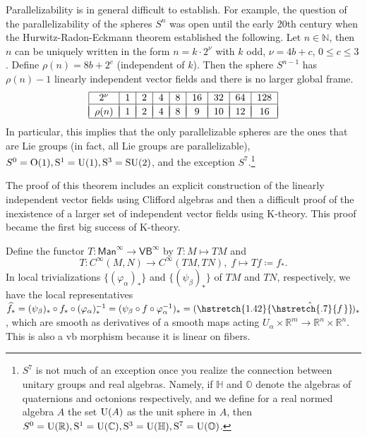 \documentclass[english,letterpaper]{article}%
\numberwithin{equation}{section}
\numberwithin{figure}{section}
\numberwithin{table}{section}
\theoremstyle{definition}
\theoremstyle{definition}
\theoremstyle{definition}
\theoremstyle{plain}
\theoremstyle{plain}
\theoremstyle{plain}
\theoremstyle{plain}
\theoremstyle{remark}
\theoremstyle{remark}
\def\red{\color{red}}
\renewcommand{\leq}{\leqslant}
\newcommand{\PRLsep}{   %
           \noindent\makebox[\linewidth]{
                \resizebox{0.5\linewidth}{1pt}{$\blacklozenge$}}}
\newcommand\wh[1]{\hstretch{1.42}{\hat{\hstretch{.7}{#1\mkern2mu}}}\mkern-2mu} %
\begin{document}
\begin{rem}
Parallelizability is in general difficult to establish. For example, the question of the parallelizability of the spheres $S^n$ was open until the early 20th century when the Hurwitz-Radon-Eckmann theorem established the following. Let $n\in\mathbb{N}$, then $n$ can be uniquely written in the form $n=k\cdot 2^\nu$ with $k$ odd, $\nu=4b+c$, $0\leq c\leq 3$. Define $\rho(n)=8b+2^c$ (independent of $k$). Then the sphere $S^{n-1}$ has $\rho(n)-1$ linearly independent vector fields and there is no larger global frame. 
\[\begin{tabular}{|c|c|c|c|c|c|c|c|c|}
\hline 
$2^\nu$ & 1 & 2 & 4 & 8 & 16 & 32 & 64 & 128\tabularnewline
\hline &&&&&&&&\\[-1em]
$\rho(n)$ &1 & 2 & 4 & 8 & 9 & 10 & 12 & 16\tabularnewline
\hline 
\end{tabular}\]
In particular, this implies that the only parallelizable spheres are the ones that are Lie groups (in fact, all Lie groups are parallelizable), $S^0=\rm{O}(1),S^1=\rm{U}(1),S^3=\rm{SU}(2)$, and the exception $S^7$.\footnote{$S^7$ is not much of an exception once you realize the connection between unitary groups and real algebras. Namely, if $\mathbb{H}$ and $\mathbb{O}$ denote the algebras of quaternions and octonions respectively, and we define for a real normed algebra $A$ the set ${\rm U}(A)$ as the unit sphere in $A$, then $S^0=\rm{U}(\mathbb{R}),S^1=\rm{U}(\mathbb{C}),S^3=\rm{U}(\mathbb{H}),S^7=\rm{U}(\mathbb{O})$.}

The proof of this theorem includes an explicit construction of the linearly independent vector fields using Clifford algebras and then a difficult proof of the inexistence of a larger set of independent vector fields using K-theory. This proof became the first big success of K-theory.
\end{rem}

\begin{defn}
Define the functor $T:\mathsf{Man}^\infty \to \mathsf{VB}^\infty$ by $T:M\mapsto TM$ and \[T:C^\infty(M,N)\to C^\infty(TM,TN),\; f\mapsto Tf\coloneqq f_\ast.\]
In local trivializations $\{(\varphi_\alpha)_\ast\}$ and $\{(\psi_\beta)_\ast\}$ of $TM$ and $TN$, respectively, we have the local representatives $\widehat{ f_\ast}=(\psi_\beta)_\ast\circ f_\ast \circ (\varphi_\alpha)_\ast^{-1}=(\psi_\beta\circ f\circ\varphi_\alpha^{-1})_\ast=(\wh{f})_\ast$, which are smooth as derivatives of a smooth maps acting $U_\alpha\times \mathbb{R}^m\to \mathbb{R}^{n}\times\mathbb{R}^n$. This is also a \gls{vb} morphism because it is linear on fibers.
\end{defn}
\end{document}

